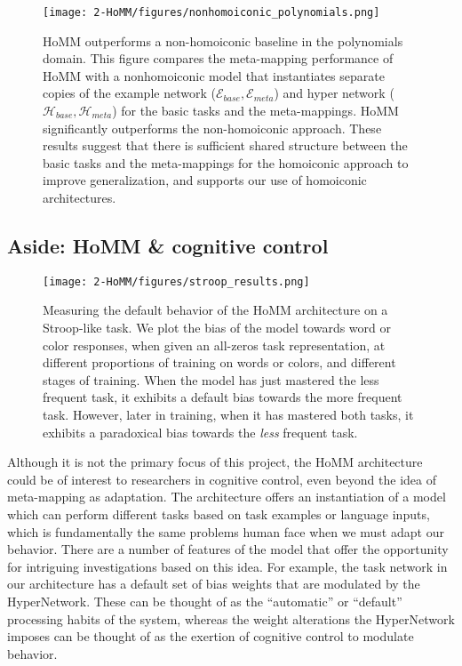 \begin{figure}[htb]
\centering
\texttt{[image: 2-HoMM/figures/nonhomoiconic\_polynomials.png]}
\caption[HoMM outperforms a non-homoiconic baseline in the polynomials domain.]{HoMM outperforms a non-homoiconic baseline in the polynomials domain. This figure compares the meta-mapping performance of HoMM with a nonhomoiconic model that instantiates separate copies of the example network (\(\mathcal{E}_{base},\mathcal{E}_{meta}\)) and hyper network (\(\mathcal{H}_{base},\mathcal{H}_{meta}\)) for the basic tasks and the meta-mappings. HoMM significantly outperforms the non-homoiconic approach. These results suggest that there is sufficient shared structure between the basic tasks and the meta-mappings for the homoiconic approach to improve generalization, and supports our use of homoiconic architectures.} \label{fig:HoMM:nonhomoiconic_baseline}
\end{figure}


\subsection{Aside: HoMM \& cognitive control}
\begin{figure}
\centering
\texttt{[image: 2-HoMM/figures/stroop\_results.png]}
\caption[Measuring the default behavior of the HoMM architecture on a Stroop-like task.]{Measuring the default behavior of the HoMM architecture on a Stroop-like task. We plot the bias of the model towards word or color responses, when given an all-zeros task representation, at different proportions of training on words or colors, and different stages of training. When the model has just mastered the less frequent task, it exhibits a default bias towards the more frequent task. However, later in training, when it has mastered both tasks, it exhibits a paradoxical bias towards the \emph{less} frequent task.} \label{supp_fig:HoMM_cognitive_control}
\end{figure}

Although it is not the primary focus of this project, the HoMM architecture could be of interest to researchers in cognitive control, even beyond the idea of meta-mapping as adaptation. The architecture offers an instantiation of a model which can perform different tasks based on task examples or language inputs, which is fundamentally the same problems human face when we must adapt our behavior. There are a number of features of the model that offer the opportunity for intriguing investigations based on this idea. For example, the task network in our architecture has a default set of bias weights that are modulated by the HyperNetwork. These can be thought of as the ``automatic'' or ``default'' processing habits of the system, whereas the weight alterations the HyperNetwork imposes can be thought of as the exertion of cognitive control to modulate behavior. 

